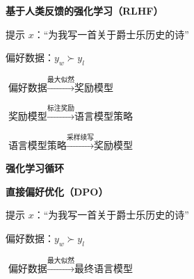 \begin{minipage}[t]{.57\linewidth}
\centering
\textbf{基于人类反馈的强化学习（RLHF）}\par
提示 $x$：“为我写一首关于爵士乐历史的诗”\par
偏好数据：$y_w\succ y_l$\par
$\displaystyle\text{偏好数据}\xrightarrow{\text{最大似然}}\text{奖励模型}$\par
$\displaystyle\text{奖励模型}\xrightarrow{\text{标注奖励}}\text{语言模型策略}$\par
$\displaystyle\text{语言模型策略}\xrightarrow{\text{采样续写}}\text{奖励模型}$\par
\textbf{强化学习循环}
\end{minipage}\hfill
\begin{minipage}[t]{.40\linewidth}
\centering
\textbf{直接偏好优化（DPO）}\par
提示 $x$：“为我写一首关于爵士乐历史的诗”\par
偏好数据：$y_w\succ y_l$\par
$\displaystyle\text{偏好数据}\xrightarrow{\text{最大似然}}\text{最终语言模型}$
\end{minipage}
